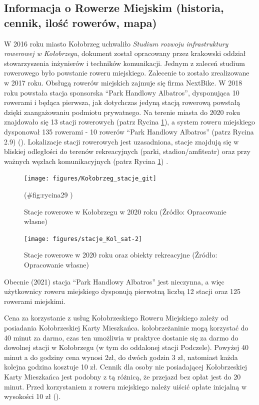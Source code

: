 \documentclass{amuthesis}
\begin{document}
\hypertarget{rower_M}{%
\subsection{Informacja o Rowerze Miejskim (historia, cennik, ilość rowerów, mapa)}\label{rower_M}}

W 2016 roku miasto Kołobrzeg uchwaliło \emph{Studium rozwoju infrastruktury rowerowej w Kołobrzegu}, dokument został opracowany przez krakowski oddział stowarzyszenia inżynierów i techników komunikacji.
Jednym z zaleceń studium rowerowego było powstanie roweru miejskiego.
Zalecenie to zostało zrealizowane w 2017 roku.
Obsługą rowerów miejskich zajmuje się firma NextBike.
W 2018 roku powstała stacja sponsorska ``Park Handlowy Albatros'', dysponująca 10 rowerami i będąca pierwsza, jak dotychczas jedyną stacją rowerową powstałą dzięki zaangażowaniu podmiotu prywatnego.
Na terenie miasta do 2020 roku znajdowało się 13 stacji rowerowych (patrz Rycina \ref{fig:ryc9}), a system roweru miejskiego dysponował 135 rowerami - 10 rowerów ``Park Handlowy Albatros'' (patrz Rycina 2.9) (\textcite{kolobrzeskirower}).
Lokalizacje stacji rowerowych jest uzasadniona, stacje znajdują się w bliskiej odległości do terenów rekreacyjnych (parki, stadion/amfiteatr) oraz przy ważnych węzłach komunikacyjnych (patrz Rycina \ref{fig:ryc9}) .

\begin{figure}[t]

{\centering \texttt{[image: figures/Kołobrzeg\_stacje\_git]} 

}

\caption{Stacje rowerowe w Kołobrzegu w 2020 roku (Źródło: Opracowanie własne)}(\#fig:rycina29 )
\end{figure}

\begin{figure}[t]

{\centering \texttt{[image: figures/stacje\_Kol\_sat-2]} 

}

\caption{Stacje rowerowe w 2020 roku oraz obiekty rekreacyjne (Źródło: Opracowanie własne)}\label{fig:ryc9}
\end{figure}

Obecnie (2021) stacja ``Park Handlowy Albatros'' jest nieczynna, a więc użytkownicy roweru miejskiego dysponują pierwotną liczbą 12 stacji oraz 125 rowerami miejskimi.

Cena za korzystanie z usług Kołobrzeskiego Roweru Miejskiego zależy od posiadania Kołobrzeskiej Karty Mieszkańca.
kołobrzeżaninie mogą korzystać do 40 minut za darmo, czas ten umożliwia w praktyce dostanie się za darmo do dowolnej stacji w Kołobrzegu (w tym do oddalonej stacji Podczele). Powyżej 40 minut a do godziny cena wynosi 2zł, do dwóch godzin 3 zł, natomiast każda kolejna godzina kosztuje 10 zł.
Cennik dla osoby nie posiadającej Kołobrzeskiej Karty Mieszkańca jest podobny z tą różnicą, że przejazd bez opłat jest do 20 minut.
Przed korzystaniem z roweru miejskiego należy uiścić opłate inicjalną w wysokości 10 zł (\textcite{kolobrzeskirower}).
\end{document}
